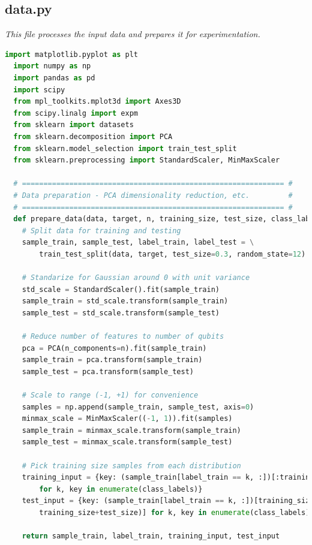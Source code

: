 \documentclass{article}
\begin{document}
\subsection*{data.py}
  \begin{center}
    \textit{This file processes the input data and prepares it for experimentation.}
  \end{center}

  \begin{lstlisting}[language=Python]
  import matplotlib.pyplot as plt
  import numpy as np
  import pandas as pd
  import scipy
  from mpl_toolkits.mplot3d import Axes3D
  from scipy.linalg import expm
  from sklearn import datasets
  from sklearn.decomposition import PCA
  from sklearn.model_selection import train_test_split
  from sklearn.preprocessing import StandardScaler, MinMaxScaler

  # ============================================================= #
  # Data preparation - PCA dimensionality reduction, etc.         #
  # ============================================================= #
  def prepare_data(data, target, n, training_size, test_size, class_labels):
    # Split data for training and testing
    sample_train, sample_test, label_train, label_test = \
        train_test_split(data, target, test_size=0.3, random_state=12)

    # Standarize for Gaussian around 0 with unit variance
    std_scale = StandardScaler().fit(sample_train)
    sample_train = std_scale.transform(sample_train)
    sample_test = std_scale.transform(sample_test)

    # Reduce number of features to number of qubits
    pca = PCA(n_components=n).fit(sample_train)
    sample_train = pca.transform(sample_train)
    sample_test = pca.transform(sample_test)

    # Scale to range (-1, +1) for convenience
    samples = np.append(sample_train, sample_test, axis=0)
    minmax_scale = MinMaxScaler((-1, 1)).fit(samples)
    sample_train = minmax_scale.transform(sample_train)
    sample_test = minmax_scale.transform(sample_test)

    # Pick training size samples from each distribution
    training_input = {key: (sample_train[label_train == k, :])[:training_size] \
        for k, key in enumerate(class_labels)}
    test_input = {key: (sample_train[label_train == k, :])[training_size:(
        training_size+test_size)] for k, key in enumerate(class_labels)}

    return sample_train, label_train, training_input, test_input


\end{lstlisting}
\end{document}
